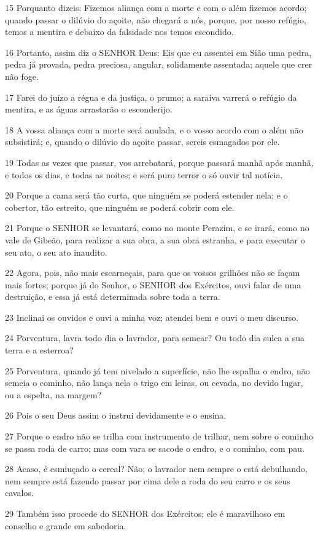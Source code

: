 \par 15 Porquanto dizeis: Fizemos aliança com a morte e com o além fizemos acordo; quando passar o dilúvio do açoite, não chegará a nós, porque, por nosso refúgio, temos a mentira e debaixo da falsidade nos temos escondido.
\par 16 Portanto, assim diz o SENHOR Deus: Eis que eu assentei em Sião uma pedra, pedra já provada, pedra preciosa, angular, solidamente assentada; aquele que crer não foge.
\par 17 Farei do juízo a régua e da justiça, o prumo; a saraiva varrerá o refúgio da mentira, e as águas arrastarão o esconderijo.
\par 18 A vossa aliança com a morte será anulada, e o vosso acordo com o além não subsistirá; e, quando o dilúvio do açoite passar, sereis esmagados por ele.
\par 19 Todas as vezes que passar, vos arrebatará, porque passará manhã após manhã, e todos os dias, e todas as noites; e será puro terror o só ouvir tal notícia.
\par 20 Porque a cama será tão curta, que ninguém se poderá estender nela; e o cobertor, tão estreito, que ninguém se poderá cobrir com ele.
\par 21 Porque o SENHOR se levantará, como no monte Perazim, e se irará, como no vale de Gibeão, para realizar a sua obra, a sua obra estranha, e para executar o seu ato, o seu ato inaudito.
\par 22 Agora, pois, não mais escarneçais, para que os vossos grilhões não se façam mais fortes; porque já do Senhor, o SENHOR dos Exércitos, ouvi falar de uma destruição, e essa já está determinada sobre toda a terra.
\par 23 Inclinai os ouvidos e ouvi a minha voz; atendei bem e ouvi o meu discurso.
\par 24 Porventura, lavra todo dia o lavrador, para semear? Ou todo dia sulca a sua terra e a esterroa?
\par 25 Porventura, quando já tem nivelado a superfície, não lhe espalha o endro, não semeia o cominho, não lança nela o trigo em leiras, ou cevada, no devido lugar, ou a espelta, na margem?
\par 26 Pois o seu Deus assim o instrui devidamente e o ensina.
\par 27 Porque o endro não se trilha com instrumento de trilhar, nem sobre o cominho se passa roda de carro; mas com vara se sacode o endro, e o cominho, com pau.
\par 28 Acaso, é esmiuçado o cereal? Não; o lavrador nem sempre o está debulhando, nem sempre está fazendo passar por cima dele a roda do seu carro e os seus cavalos.
\par 29 Também isso procede do SENHOR dos Exércitos; ele é maravilhoso em conselho e grande em sabedoria.

